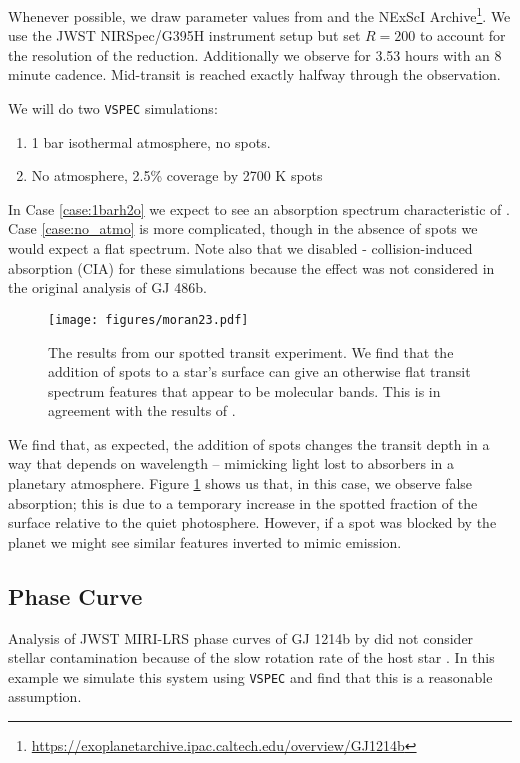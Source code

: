 \documentclass[twocolumn]{aastex631}
\newcommand{\vspec}[1]{\texttt{VSPEC}#1}
\begin{document}
Whenever possible, we draw parameter values from \citet{moran2023} and the NExScI Archive\footnote{\url{https://exoplanetarchive.ipac.caltech.edu/overview/GJ1214b}}.
We use the JWST NIRSpec/G395H instrument setup but set $R=200$ to account for the resolution of the reduction.
Additionally we observe for 3.53 hours with an 8 minute cadence. Mid-transit is reached exactly halfway through the observation.

We will do two \vspec{} simulations:
\begin{enumerate}
    \item 1 bar  isothermal atmosphere, no spots. \label{case:1barh2o}
    \item No atmosphere, 2.5\% coverage by 2700 K spots \label{case:no_atmo}
\end{enumerate}
In Case \ref{case:1barh2o} we expect to see an absorption spectrum characteristic of . Case \ref{case:no_atmo} is more complicated, though in the absence of spots we would expect a flat spectrum. Note also that we disabled - collision-induced absorption (CIA) for
these simulations because the effect was not considered in the original analysis of GJ 486b.

\begin{figure}
    \centering
    \texttt{[image: figures/moran23.pdf]}
    \caption{
        The results from our spotted transit experiment. We find that the addition of
        spots to a star's surface can give an otherwise flat transit spectrum features that appear to be molecular bands.
        This is in agreement with the results of \citet{moran2023}.
        }
    \label{fig:moran_transit}
\end{figure}

We find that, as expected, the addition of spots changes the transit depth in a way that depends on wavelength -- mimicking
light lost to absorbers in a planetary atmosphere. Figure \ref{fig:moran_transit} shows us that, in this case, we observe false absorption;
this is due to a temporary increase in the spotted fraction of the surface relative to the quiet photosphere. However, if a spot was blocked by
the planet we might see similar features inverted to mimic emission.

\subsection{Phase Curve}
Analysis of JWST MIRI-LRS phase curves of GJ 1214b by \citet{kempton2023} did not consider stellar
contamination because of the slow rotation rate of the host star \citep[approximately 1/80$^{\text{th}}$ the orbital frequency,][]{cloutier2021}.
In this example we simulate this system using \vspec{} and find that this is a reasonable assumption.
\end{document}
